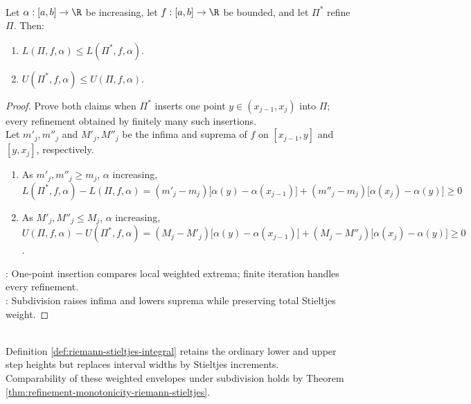 \begin{theorem} \label{thm:refinement-monotonicity-riemann-stieltjes} \\
Let $\alpha:[a,b]\to\R$ be increasing, let $f:[a,b]\to\R$ be bounded, and let $\Pi^\ast$ refine $\Pi$. Then:
\begin{enumerate}[label=(\roman*)]
\setlength{\itemsep}{0pt}
\item $L(\Pi,f,\alpha)\leq L(\Pi^\ast,f,\alpha)$.
\item $U(\Pi^\ast,f,\alpha)\leq U(\Pi,f,\alpha)$.
\end{enumerate}
\begin{proof} Prove both claims when $\Pi^\ast$ inserts one point $y\in(x_{j-1},x_j)$ into $\Pi$; every refinement obtained by finitely many such insertions.\\
Let $m'_j,m''_j$ and $M'_j,M''_j$ be the infima and suprema of $f$ on $[x_{j-1},y]$ and $[y,x_j]$, respectively.
\begin{enumerate}[label=(\roman*)]
\setlength{\itemsep}{0pt}
\item As $m'_j,m''_j\geq m_j$, $\alpha$ increasing, $L(\Pi^\ast,f,\alpha)-L(\Pi,f,\alpha) =(m'_j-m_j)\bigl[\alpha(y)-\alpha(x_{j-1})\bigr] +(m''_j-m_j)\bigl[\alpha(x_j)-\alpha(y)\bigr]\geq0$
\item As $M'_j,M''_j\leq M_j$, $\alpha$ increasing, $U(\Pi,f,\alpha)-U(\Pi^\ast,f,\alpha) =(M_j-M'_j)\bigl[\alpha(y)-\alpha(x_{j-1})\bigr] +(M_j-M''_j)\bigl[\alpha(x_j)-\alpha(y)\bigr]\geq0$.
\end{enumerate}
: One-point insertion compares local weighted extrema; finite iteration handles every refinement.\\
: Subdivision raises infima and lowers suprema while preserving total Stieltjes weight.
\end{proof}
\end{theorem}

\begin{perspective} \label{per:piecewise-constant-envelope-view} \\
Definition \ref{def:riemann-stieltjes-integral} retains the ordinary lower and upper step heights but replaces interval widths by Stieltjes increments.\\
Comparability of these weighted envelopes under subdivision holds by Theorem \ref{thm:refinement-monotonicity-riemann-stieltjes}.
\end{perspective}

